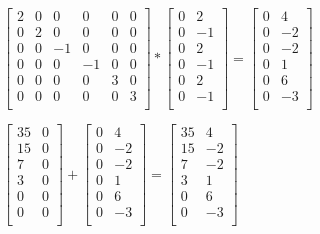 \documentclass{article}
\begin{document}
$
\begin{bmatrix}
2&0&0&0&0&0\\
0&2&0&0&0&0\\
0&0&-1&0&0&0\\
0&0&0&-1&0&0\\
0&0&0&0&3&0\\
0&0&0&0&0&3\\
\end{bmatrix}
*
\begin{bmatrix}
0&2\\
0&-1\\
0&2\\
0&-1\\
0&2\\
0&-1\\
\end{bmatrix}
= 
\begin{bmatrix}
0&4\\
0&-2\\
0&-2\\
0&1\\
0&6\\
0&-3\\
\end{bmatrix}
$
\vspace{1cm} 

$
\begin{bmatrix}
35&0\\
15&0\\
7&0\\
3&0\\
0&0\\
0&0\\
\end{bmatrix}
+
\begin{bmatrix}
0&4\\
0&-2\\
0&-2\\
0&1\\
0&6\\
0&-3\\
\end{bmatrix}
=
\begin{bmatrix}
35&4\\
15&-2\\
7&-2\\
3&1\\
0&6\\
0&-3\\
\end{bmatrix}
$
\end{document}
